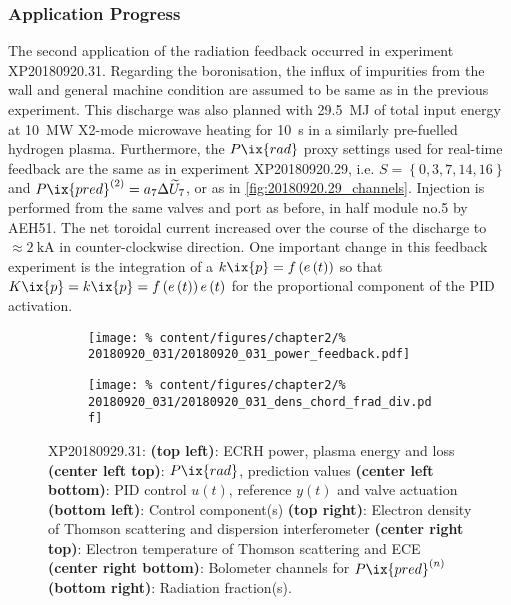         \subsubsection*{Application Progress}%
%
            The second application of the radiation feedback occurred in experiment XP20180920.31. Regarding the boronisation, the influx of impurities from the wall and general machine condition are assumed to be same as in the previous experiment. This discharge was also planned with \SI{29.5}{\mega\joule} of total input energy at \SI{10}{\mega\watt} X2-mode microwave heating for \SI{10}{\second} in a similarly pre-fuelled hydrogen plasma. Furthermore, the $P\ix{rad}$ proxy settings used for real-time feedback are the same as in experiment XP20180920.29, i.e. $S=\left\{0, 3, 7, 14, 16\right\}$ and $P\ix{pred}^{\left(2\right)}=a_{7}\Delta\widetilde{U}_{7}$, or as in \cref{fig:20180920.29_channels}. Injection is performed from the same valves and port as before, in half module no.5 by AEH51. The net toroidal current increased over the course of the discharge to $\approx\SI{2}{\kilo\ampere}$ in counter-clockwise direction. One important change in this feedback experiment is the integration of a $k\ix{p}=f\left(e\left(t\right)\right)$ so that $K\ix{p}=k\ix{p}=f\left(e\left(t\right)\right)e\left(t\right)$ for the proportional component of the PID activation.\\%
%
            \begin{figure}[t]%
                \centering%
                \begin{subfigure}{.48\textwidth}%
                    \centering%
                    \texttt{[image: \%
                        content/figures/chapter2/\%
                        20180920\_031/20180920\_031\_power\_feedback.pdf]}%
                \end{subfigure}%
                \hspace*{0.2cm}%
                \begin{subfigure}{.48\textwidth}%
                    \centering%
                    \texttt{[image: \%
                        content/figures/chapter2/\%
                        20180920\_031/20180920\_031\_dens\_chord\_frad\_div.pdf]}%
                \end{subfigure}%
                \caption{%
                    XP20180929.31: %
                    \textbf{(top left)}: ECRH power, plasma energy and loss \textbf{(center left top)}: $P\ix{rad}$, prediction values \textbf{(center left bottom)}: PID control $u\left(t\right)$, reference $y\left(t\right)$ and valve actuation \textbf{(bottom left)}: Control component(s) \textbf{(top right)}: Electron density of Thomson scattering and dispersion interferometer \textbf{(center right top)}: Electron temperature of Thomson scattering and ECE \textbf{(center right bottom)}: Bolometer channels for $P\ix{pred}^{\left(n\right)}$ \textbf{(bottom right)}: Radiation fraction(s).}\label{fig:20180920.31_PDF}%
            \end{figure}%
